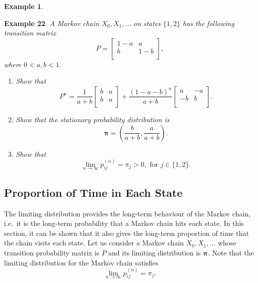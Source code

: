 \documentclass[
]{book}
\theoremstyle{definition}
\theoremstyle{definition}
\newtheorem{example}{Example}[chapter]
\theoremstyle{definition}
\theoremstyle{definition}
\theoremstyle{remark}
\begin{document}
\begin{example}
\protect\hypertarget{exm:exampleStationary}{}\label{exm:exampleStationary}

\textbf{Example 22}. \emph{A Markov chain \(X_0, X_1, \ldots\) on states \(\{1,2\}\)
has the following transition matrix \[P = \begin{bmatrix}
    1-a & a   \\
    b & 1-b   \\
\end{bmatrix},\] where \(0 < a,b < 1.\)}

\begin{enumerate}
\def\labelenumi{\arabic{enumi}.}
\item
  \emph{Show that \[P^n = \frac{1}{a+b} \begin{bmatrix}
      b & a   \\
      b & a   \\
  \end{bmatrix} +
  \frac{(1-a-b)^n}{a+b} \begin{bmatrix}
      a & -a   \\
      -b & b   \\
  \end{bmatrix}.\]}
\item
  \emph{Show that the stationary probability distribution is
  \[\boldsymbol{\pi} = \left( \frac{b}{a+b},  \frac{a}{a+b} \right)  .\]}
\item
  \emph{Show that
  \[\lim_{n \rightarrow \infty} p_{ij}^{(n)} = \pi_j > 0 , \text{ for }j \in \{1,2\}.\]}
\end{enumerate}

\end{example}

\hypertarget{proportion-of-time-in-each-state}{%
\subsection*{Proportion of Time in Each State}\label{proportion-of-time-in-each-state}}

The limiting distribution provides the long-term behaviour of the Markov
chain, i.e.~it is the long-term probability that a Markov chain hits
each state. In this section, it can be shown that it also gives the
long-term proportion of time that the chain visits each state. Let us
consider a Markov chain \(X_0, X_1, \ldots\) whose transition probability
matrix is \(P\) and its limiting distribution is \(\boldsymbol{\pi}\). Note
that the limiting distribution for the Markov chain satisfies
\[\lim_{n \rightarrow \infty}  p^{(n)}_{ij} =  \pi_j.\]
\end{document}
